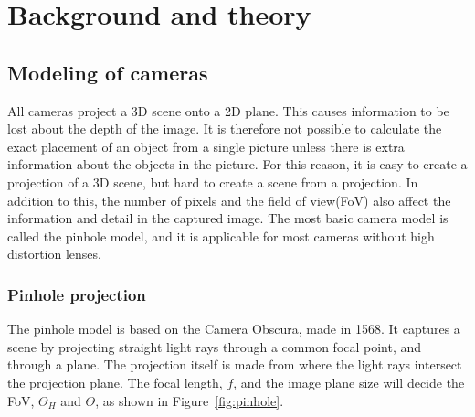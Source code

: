
\chapter{Background and theory}
\section{Modeling of cameras}

All cameras project a 3D scene onto a 2D plane. This causes information to be lost about the depth of the image. It is therefore not possible to calculate the exact placement of an object from a single picture unless there is extra information about the objects in the picture. For this reason, it is easy to create a projection of a 3D scene, but hard to create a scene from a projection. In addition to this, the number of pixels and the field of view(FoV) also affect the information and detail in the captured image. The most basic camera model is called the pinhole model, and it is applicable for most cameras without high distortion lenses.

\subsection{Pinhole projection} \label{sec:pinhole}
The pinhole model is based on the Camera Obscura, made in 1568. It captures a scene by projecting straight light rays through a common focal point, and through a plane. The projection itself is made from where the light rays intersect the projection plane. The focal length, $f$, and the image plane size will decide the FoV, $\Theta_H$ and $\Theta$, as shown in Figure~\ref{fig:pinhole}. 

